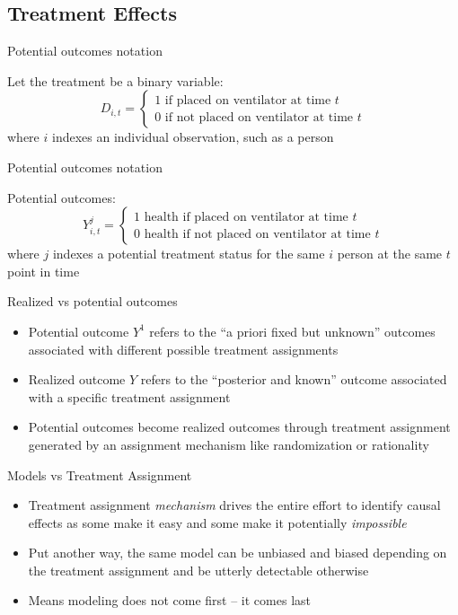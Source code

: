 \documentclass{beamer}
\begin{document}
\subsection{Treatment Effects}

\begin{frame}{Potential outcomes notation}

Let the treatment be a binary variable: $$D_{i,t} =\begin{cases} 1 \text{ if placed on ventilator at time $t$} \\ 0 \text{ if not placed on ventilator at time $t$} \end{cases}$$where $i$ indexes an individual observation, such as a person
\end{frame}

\begin{frame}{Potential outcomes notation}

Potential outcomes: $$Y_{i,t}^j =\begin{cases} 1 \text{ health if placed on ventilator at time $t$} \\ 0 \text{ health if not placed on ventilator at time $t$} \end{cases}$$where $j$ indexes a potential treatment status for the same $i$ person at the same $t$ point in time
\end{frame}


\begin{frame}{Realized vs potential outcomes}

  \begin{itemize}
    \item Potential outcome $Y^1$ refers to the ``a priori fixed but unknown'' outcomes associated with different possible treatment assignments
    \item Realized outcome $Y$ refers to the ``posterior and known'' outcome associated with a specific treatment assignment
    \item Potential outcomes become realized outcomes through treatment assignment generated by an assignment mechanism like randomization or rationality
  \end{itemize}
\end{frame}


\begin{frame}{Models vs Treatment Assignment}

\begin{itemize}
    \item Treatment assignment \emph{mechanism} drives the entire effort to identify causal effects as some make it easy and some make it potentially \emph{impossible}
	\item Put another way, the same model can be unbiased and biased depending on the treatment assignment and be utterly detectable otherwise
	\item Means modeling does not come first -- it comes last
	\end{itemize}
\end{frame}
\end{document}
